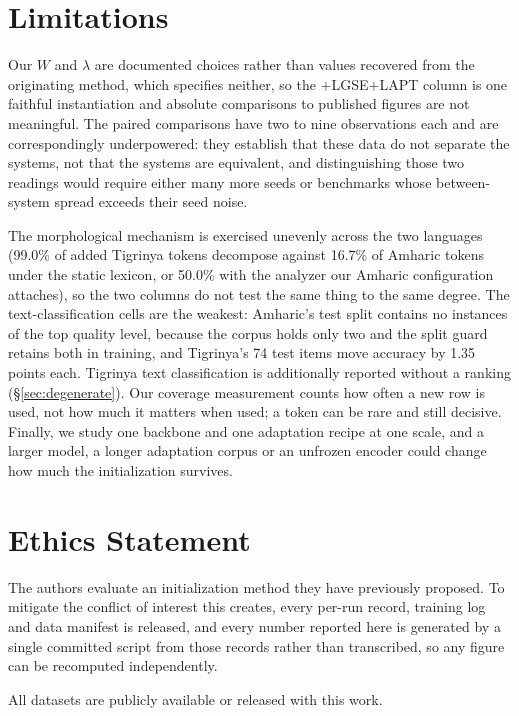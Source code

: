 \documentclass[11pt]{article}
\begin{document}
\section*{Limitations}

Our $W$ and $\lambda$ are documented choices rather than values recovered
from the originating method, which specifies neither, so the +LGSE+LAPT
column is one faithful instantiation and absolute comparisons to published
figures are not meaningful. The paired comparisons have two to nine
observations each and are correspondingly underpowered: they establish that
these data do not separate the systems, not that the systems are equivalent,
and distinguishing those two readings would require either many more seeds or
benchmarks whose between-system spread exceeds their seed noise.

The morphological mechanism is exercised unevenly across the two languages
(99.0\% of added Tigrinya tokens decompose against 16.7\% of Amharic tokens
under the static lexicon, or 50.0\% with the analyzer our Amharic
configuration attaches), so the two columns do not test the same thing to the
same degree. The text-classification cells are the weakest: Amharic's test
split contains no instances of the top quality level, because the corpus
holds only two and the split guard retains both in training, and Tigrinya's
74 test items move accuracy by 1.35 points each. Tigrinya text classification
is additionally reported without a ranking (\S\ref{sec:degenerate}). Our
coverage measurement counts how often a new row is used, not how much it
matters when used; a token can be rare and still decisive. Finally, we study
one backbone and one adaptation recipe at one scale, and a larger model, a
longer adaptation corpus or an unfrozen encoder could change how much the
initialization survives.

\section*{Ethics Statement}

The authors evaluate an initialization method they have previously proposed.
To mitigate the conflict of interest this creates, every per-run record,
training log and data manifest is released, and every number reported here is
generated by a single committed script from those records rather than
transcribed, so any figure can be recomputed independently.

All datasets are publicly available or released with this work.
\end{document}
